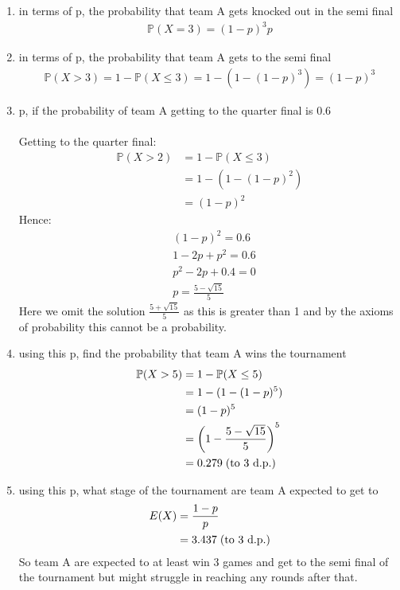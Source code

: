 \documentclass[,oneside]{article}
\begin{document}
\begin{enumerate}
\begin{enumerate}
\item in terms of p, the probability that team A gets knocked out in the semi final
\begin{align*}
\mathbb{P}(X=3)=(1-p)^3 p
\end{align*}
\item in terms of p, the probability that team A gets to the semi final 
\begin{align*}
 \mathbb{P}(X > 3) = 1-\mathbb{P}(X \leq 3) = 1-(1-(1-p)^3)=(1-p)^3
\end{align*}
\item p, if the probability of team A getting to the quarter final is 0.6\\ \\
Getting to the quarter final:
\begin{align*}
\mathbb{P}(X > 2) &= 1-\mathbb{P}(X \leq 3) \\
&= 1-(1-(1-p)^2)\\
&=(1-p)^2
\end{align*}
Hence:
\begin{align*}
&(1-p)^2 = 0.6\\
&1-2p+p^2 = 0.6\\
&p^2-2p+0.4=0\\
&p = \frac{5 - \sqrt{15}}{5}
\end{align*}
Here we omit the solution $\frac{5 + \sqrt{15}}{5}$ as this is greater than 1 and by the axioms of probability this cannot be a probability.
\item using this p, find the probability that team A wins the tournament
\begin{align*}
 \mathbb{P}(X > 5) &= 1-\mathbb{P}(X \leq 5) \\
 &= 1-(1-(1-p)^5)\\
 &=(1-p)^5\\
 &=\left (1-\frac{5 - \sqrt{15}}{5} \right )^5\\
 &=0.279 \hspace{0.1cm}\text{(to 3 d.p.)}
\end{align*}
\item using this p, what stage of the tournament are team A expected to get to
\begin{align*}
E(X)&=\frac{1-p}{p}\\
&= 3.437 \hspace{0.1cm}\text{(to 3 d.p.)}
\end{align*}
So team A are expected to at least win 3 games and get to the semi final of the tournament but might struggle in reaching any rounds after that.\\

\end{enumerate}
\end{enumerate}
\end{document}
